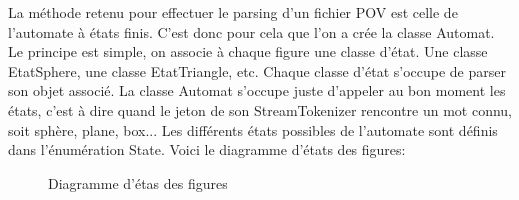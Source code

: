 \documentclass[../../Rapport RayTracer]{subfiles}
\begin{document}
La méthode retenu pour effectuer le parsing d'un fichier POV est celle de l'automate à états finis. C'est donc pour cela que l'on a crée la classe Automat. Le principe est simple, on associe à chaque figure une classe d'état. Une classe EtatSphere, une classe EtatTriangle, etc. Chaque classe d'état s'occupe de parser son objet associé. La classe Automat s'occupe juste d'appeler au bon moment les états, c'est à dire quand le jeton de son StreamTokenizer rencontre un mot connu, soit sphère, plane, box... Les différents états possibles de l'automate sont définis dans l'énumération State. 
Voici le diagramme d'états des figures:

\begin{figure}[h!]
	
	\caption{Diagramme d'étas des figures}
	\label{diagrammeEtatFigure}
\end{figure}
\FloatBarrier
\end{document}

